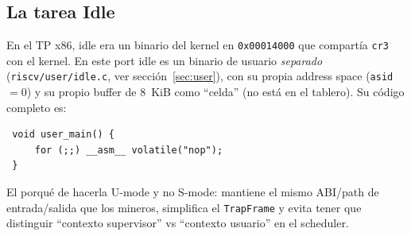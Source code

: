 \subsection{La tarea Idle}

En el TP x86, idle era un binario del kernel en \texttt{0x00014000} que compartía \texttt{cr3} con el kernel. En este
port idle es un binario de usuario \emph{separado} (\texttt{riscv/user/idle.c}, ver sección~\ref{sec:user}), con su
propia address space (\texttt{asid}$=$0) y su propio buffer de 8~KiB como ``celda'' (no está en el tablero). Su código
completo es:

\begin{codesnippet}
\begin{verbatim}
 void user_main() {
     for (;;) __asm__ volatile("nop");
 }
\end{verbatim}
\end{codesnippet}

El porqué de hacerla U-mode y no S-mode: mantiene el mismo ABI/path de entrada/salida que los mineros, simplifica el
\texttt{TrapFrame} y evita tener que distinguir ``contexto supervisor'' vs ``contexto usuario'' en el scheduler.

